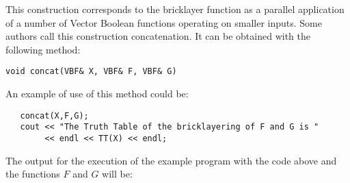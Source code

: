 This construction corresponds to the bricklayer function
\cite{DaemenR:02} as a parallel application of a number of Vector
Boolean functions operating on smaller inputs. Some authors call this
construction concatenation. It can be obtained with the following method:
     
\begin{verbatim}
void concat(VBF& X, VBF& F, VBF& G)  
\end{verbatim}

An example of use of this method could be:

\begin{verbatim}
   concat(X,F,G);
   cout << "The Truth Table of the bricklayering of F and G is "
        << endl << TT(X) << endl;
\end{verbatim}

The output for the execution of the example program with the code above and the functions $F$ and $G$ will be:


